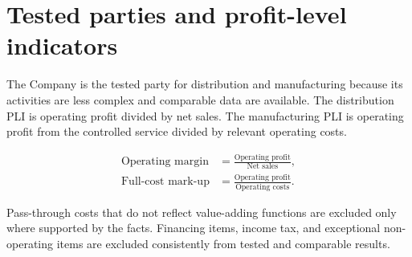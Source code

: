 \section{Tested parties and profit-level indicators}
The Company is the tested party for distribution and manufacturing because its
activities are less complex and comparable data are available. The distribution
PLI is operating profit divided by net sales. The manufacturing PLI is operating
profit from the controlled service divided by relevant operating costs.

\begin{align}
  \text{Operating margin} &= \frac{\text{Operating profit}}{\text{Net sales}},\\
  \text{Full-cost mark-up} &= \frac{\text{Operating profit}}{\text{Operating costs}}.
\end{align}

Pass-through costs that do not reflect value-adding functions are excluded only
where supported by the facts. Financing items, income tax, and exceptional
non-operating items are excluded consistently from tested and comparable results.

